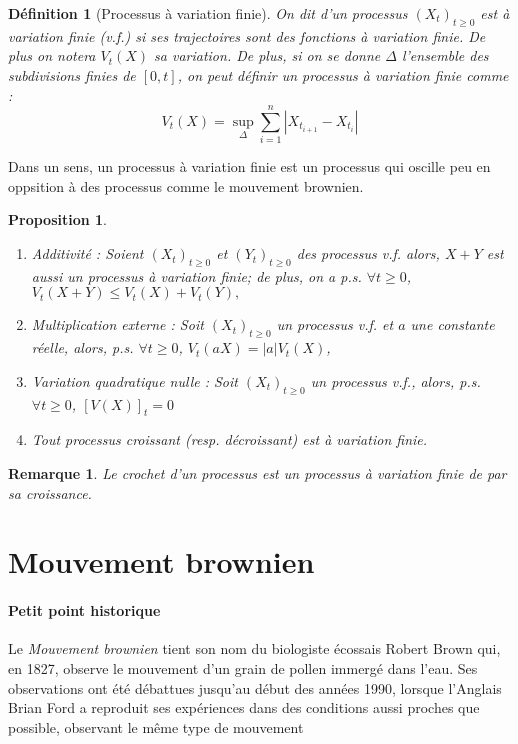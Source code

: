 \documentclass[openany]{book}
\newcommand{\1}{\mathbbm{1}}
\theoremstyle{thmfont}
\theoremstyle{deffont}
\newtheorem{definition}[definition]{Définition}
\theoremstyle{thmfont}
\newtheorem{prop}[prop]{Proposition}
\theoremstyle{deffont}
\newtheorem{remark}[remark]{Remarque}
\begin{document}
\begin{definition}[Processus à variation finie]
  On dit d'un processus $(X_t)_{t\geq0}$ est \textit{à variation finie} (v.f.) si ses trajectoires sont des fonctions à variation finie. De plus on notera $V_t(X)$ sa variation. De plus, si on se donne $\Delta$ l'ensemble des subdivisions finies de $[0,t]$, on peut définir un processus à variation finie comme :
%
  $$V_t(X) = \sup_{\Delta} \sum_{i=1}^n |X_{t_{i+1}} - X_{t_{i}}|$$
\end{definition}

Dans un sens, un processus à variation finie est un processus qui oscille peu en oppsition à des processus comme le mouvement brownien. 

\begin{prop}
  \begin{enumerate}[nosep]
  \item Additivité : Soient $(X_t)_{t\geq0}$ et $(Y_t)_{t\geq0}$ des processus v.f. alors, $X+Y$ est aussi un processus à variation finie; de plus, on a p.s. $\forall t \geq 0$, $V_t(X+Y) \leq V_t(X)+V_t(Y),$
  \item Multiplication externe : Soit $(X_t)_{t\geq0}$ un processus v.f. et $a$ une constante réelle, alors, p.s. $\forall t\geq0$, $V_t(aX) = |a| V_t(X)$,
  \item Variation quadratique nulle : Soit $(X_t)_{t\geq0}$ un processus v.f., alors, p.s. $\forall t \geq 0$, $[V(X)]_t=0$
  \item Tout processus croissant (resp. décroissant) est à variation finie.
  \end{enumerate}
\end{prop}

\begin{remark}
  Le crochet d'un processus est un processus à variation finie de par sa croissance.
\end{remark}

\section{Mouvement brownien}
\paragraph{Petit point historique}
Le \textit{Mouvement brownien} tient son nom du biologiste écossais Robert Brown qui, en 1827, observe le mouvement d'un grain de pollen immergé dans l'eau. Ses observations ont été débattues jusqu’au début des années 1990, lorsque l’Anglais Brian Ford a reproduit ses expériences dans des conditions aussi proches que possible, observant le même type de mouvement
\end{document}

